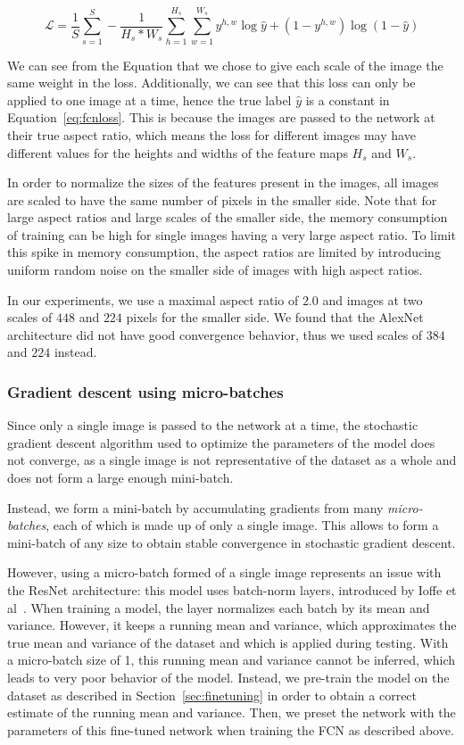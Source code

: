 \begin{equation}\label{eq:fcnloss}
\mathcal{L} = \frac{1}{S} \sum_{s=1}^S - \frac{1}{H_s*W_s}
\sum_{h=1}^{H_s} \sum_{w=1}^{W_s} y^{h,w} \log \hat{y} +
(1-y^{h,w}) \log (1-\hat{y})
\end{equation}

We can see from the Equation that we chose to give each scale of the image
the same weight in the loss. Additionally, we can see that this loss can
only be applied to one image at a time, hence the true label $\hat{y}$ is
a constant in Equation~\ref{eq:fcnloss}.
This is because the images are passed to the network at their true
aspect ratio, which means the loss for different images may have different
values for the heights and widths of the feature maps $H_s$ and $W_s$.

In order to normalize the sizes of the features present in the images,
all images are scaled to have the same
number of pixels in the smaller side. Note that for large aspect
ratios and large scales of the smaller side,
the memory consumption of training can be high for single images
having a very large aspect ratio. To limit this spike in memory
consumption, the aspect ratios are limited by introducing uniform
random noise on the smaller side of images with high aspect ratios.

In our experiments, we use a maximal aspect ratio of $2.0$ and images
at two scales of $448$ and $224$ pixels for the smaller side. We found
that the AlexNet architecture did not have good convergence behavior,
thus we used scales of $384$ and $224$ instead.

\subsubsection{Gradient descent using micro-batches}
Since only a single image is passed to the network at a time, the
stochastic gradient descent algorithm used to optimize the parameters
of the model does not converge, as a single image is not representative
of the dataset as a whole and does not form a large enough mini-batch.

Instead, we form a mini-batch by accumulating gradients from many
\emph{micro-batches}, each of which is made up of only a single image.
This allows to form a mini-batch of any size to obtain stable convergence
in stochastic gradient descent.

However, using a micro-batch formed of a single image represents an issue
with the ResNet architecture: this model uses batch-norm layers, introduced
by Ioffe et al~\cite{ioffe_batch_2015}. When training a model, the layer
normalizes each batch by its mean and variance. However, it keeps a running
mean and variance, which approximates the true mean and variance of the
dataset and which is applied during testing. With a micro-batch size
of 1, this running mean and variance cannot be inferred, which leads to
very poor behavior of the model. Instead, we pre-train the model on the
dataset as described in Section~\ref{sec:finetuning} in order to obtain
a correct estimate of the running mean and variance. Then, we preset the
network with the parameters of this fine-tuned network when training the
FCN as described above.

